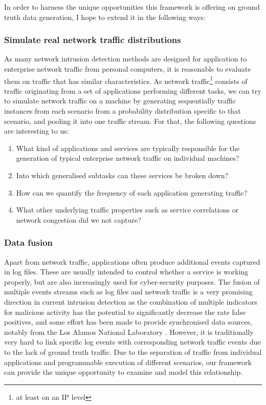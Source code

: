 \documentclass[a4paper,12pt,twoside]{report}
\begin{document}
In order to harness the unique opportunities this framework is offering on ground truth data generation, I hope to extend it in the following ways:

\subsubsection{Simulate real network traffic distributions}

As many network intrusion detection methods are designed for application to enterprise network traffic from personal computers, it is reasonable to evaluate them on traffic that has similar characteristics. As network traffic\footnote{at least on an IP level} consists of traffic originating from a set of applications performing different tasks, we can try to simulate network traffic on a machine by generating sequentially traffic instances from each scenario from a probability distribution specific to that scenario, and  pooling it into one traffic stream. For that, the following questions are interesting to us:
\begin{enumerate}
\item What kind of applications and services are typically responsible for the generation of typical enterprise network traffic on individual machines?
\item Into which generalised subtasks can these services be broken down?
\item How can we quantify the frequency of each application generating traffic?
\item What other underlying traffic properties such as service correlations or network congestion did we not capture?
\end{enumerate}

\subsubsection{Data fusion}\label{Fusion}

Apart from network traffic, applications often produce additional events captured in log files. These are usually intended to control whether a service is working properly, but are also increasingly used for cyber-security purposes. The fusion of multiple events streams such as log files and network traffic is a very promising direction in current intrusion detection as the combination of multiple indicators for malicious activity has the potential to significantly decrease the rate false positives, and some effort has been made to provide synchronised data sources, notably from the Los Alamos National Laboratory \cite{kent-2015-cyberdata1}. However, it is traditionally very hard to link specific log events with corresponding network traffic events due to the lack of ground truth traffic. Due to the separation of traffic from individual applications and programmable execution of different scenarios, our framework can provide the unique opportunity to examine and model this relationship. %
\end{document}
